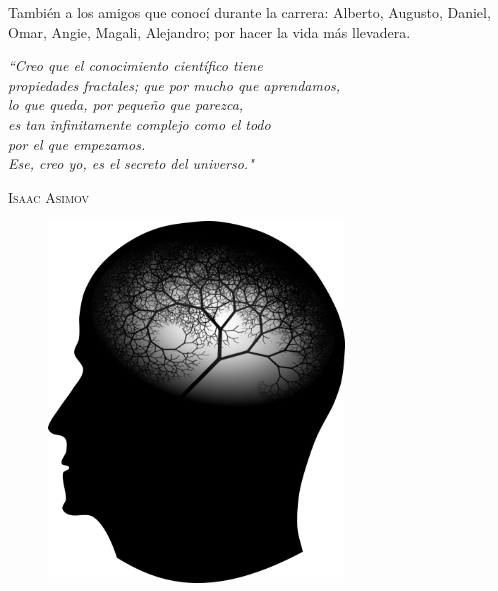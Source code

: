 \documentclass[12pt,letterpaper]{book}
\begin{document}
También a los amigos que conocí durante la carrera: Alberto, Augusto, Daniel, Omar, Angie, Magali, 
Alejandro; por hacer la vida más llevadera.


\thispagestyle{plain}

\tableofcontents
\newpage

\listoffigures
\listoftables
\newpage


\begin{center}\textit{
``Creo que el conocimiento científico tiene \\
propiedades fractales; que por mucho que aprendamos,  \\
lo que queda, por pequeño que parezca,  \\
es tan infinitamente complejo como el todo \\ 
por el que empezamos. \\
Ese, creo yo, es el secreto del universo."} 
\vspace{1em}
\end{center}
\begin{flushright}
\textsc{Isaac Asimov \cite{Asimov}}
\end{flushright}

\begin{figure}
\centering
\includegraphics[width = 0.7\textwidth]{frase.png} 
\end{figure}
\end{document}

